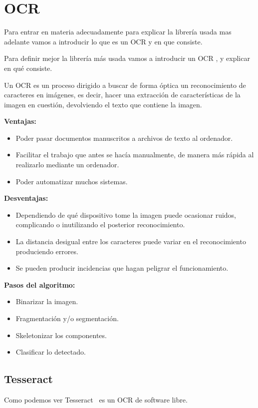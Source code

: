 \section{OCR}
Para entrar en materia adecuadamente para explicar la librería usada mas adelante vamos a introducir lo que es un OCR  \cite{OCR} y en que consiste.

Para definir  mejor la librería más usada vamos a introducir un OCR \cite{OCR}, y  explicar en qué consiste. 

Un OCR es un proceso dirigido a buscar de forma óptica un reconocimiento de caracteres en imágenes, es decir, hacer una extracción de características de la imagen en cuestión, devolviendo el texto que contiene la imagen.

\textbf{Ventajas:}
\begin{itemize}
\item Poder pasar documentos manuscritos a archivos de texto al ordenador.
\item Facilitar el trabajo que antes se hacía manualmente, de manera más rápida al realizarlo mediante un ordenador.
\item Poder automatizar muchos sistemas.
\end{itemize}

\textbf{Desventajas:}
\begin{itemize}
\item Dependiendo de qué dispositivo tome la imagen puede ocasionar ruidos, complicando o inutilizando el posterior reconocimiento.
\item La distancia desigual entre los caracteres puede variar en el reconocimiento produciendo errores. 
\item Se pueden producir incidencias que hagan peligrar  el funcionamiento.
\end{itemize}

\textbf{Pasos del algoritmo:}
\begin{itemize}
\item Binarizar la imagen.
\item Fragmentación y/o segmentación.
\item Skeletonizar los componentes.
\item Clasificar lo detectado.
\end{itemize}

\subsection{Tesseract}
Como podemos ver Tesseract~\cite{wiki:Tesseract} es un OCR de software libre.

